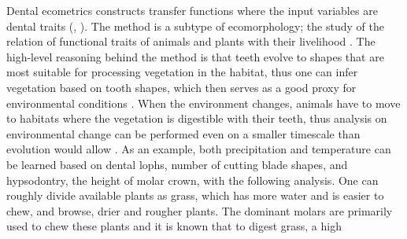 \documentclass{article}
\begin{document}
Dental ecometrics constructs transfer functions where the input variables are dental traits (\cite{Faith_Lyman_2019}, \cite{oksanenHumboldtianApproachLife2019}).
The method is a subtype of ecomorphology; the study of the relation of functional traits of animals and plants with their livelihood
\cite{oksanenHumboldtianApproachLife2019}. The high-level reasoning behind the method is that teeth evolve to 
shapes that are most suitable for processing vegetation in the habitat, thus one can infer vegetation based on tooth shapes, 
which then serves as a good proxy for environmental conditions \cite{oksanenHumboldtianApproachLife2019}. 
When the environment changes, animals have to move to habitats where the vegetation is digestible with their teeth, thus 
analysis on environmental change can be performed even on a smaller timescale than evolution would allow \cite{fortelius}. As an example, both precipitation \cite{fortelius}
and temperature \cite{oksanenHumboldtianApproachLife2019} can be learned based on dental lophs, number of cutting blade shapes, and hypsodontry, the height of 
molar crown, with the following analysis. One can roughly divide available plants as grass, which has more water and is easier to chew, and 
browse, drier and rougher plants. The dominant molars are primarily used to chew these plants and it is known that to digest grass, a high 
\end{document}
